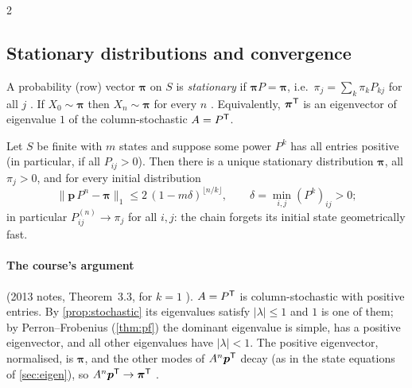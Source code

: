 \begin{paracol}{2}
\subsection{Stationary distributions and convergence}
\begin{definition}
A probability (row) vector $\bm\pi$ on $S$ is \emph{stationary} if $\bm\pi P=\bm\pi$, i.e.\
$\pi_j=\sum_k\pi_kP_{kj}$ for all $j$ . If $X_0\sim\bm\pi$ then $X_n\sim\bm\pi$ for every
$n$ \ts{13}{5}{54:52}. Equivalently, $\bm\pi^{\mathsf T}$ is an eigenvector of eigenvalue $1$ of the column-stochastic
$A=P^{\mathsf T}$.
\end{definition}

\begin{theorem}\label{ch04:thm-conv}
Let $S$ be finite with $m$ states and suppose some power $P^k$ has all entries positive (in particular, if
all $P_{ij}>0$). Then there is a unique stationary distribution $\bm\pi$, all $\pi_j>0$, and for every
initial distribution
\[
  \bigl\|\bm p\,P^n-\bm\pi\bigr\|_1\le 2\,(1-m\delta)^{\lfloor n/k\rfloor},\qquad
  \delta=\min_{i,j}(P^k)_{ij}>0 ;
\]
in particular $P^{(n)}_{ij}\to\pi_j$ for all $i,j$: the chain forgets its initial state geometrically fast.
\end{theorem}

\paragraph{The course's argument} (2013 notes, Theorem~3.3, for $k=1$ ).
$A=P^{\mathsf T}$ is column-stochastic with positive entries. By \cref{prop:stochastic}
its eigenvalues satisfy $|\lambda|\le1$ and $1$ is one of them; by
Perron--Frobenius (\cref{thm:pf}) the dominant eigenvalue is simple, has a
positive eigenvector, and all other eigenvalues have $|\lambda|<1$. The positive
eigenvector, normalised, is $\bm\pi$, and the other modes of $A^n\bm p^{\mathsf T}$
decay (as in the state equations of \cref{sec:eigen}), so
$A^n\bm p^{\mathsf T}\to\bm\pi^{\mathsf T}$ .


\end{paracol}

